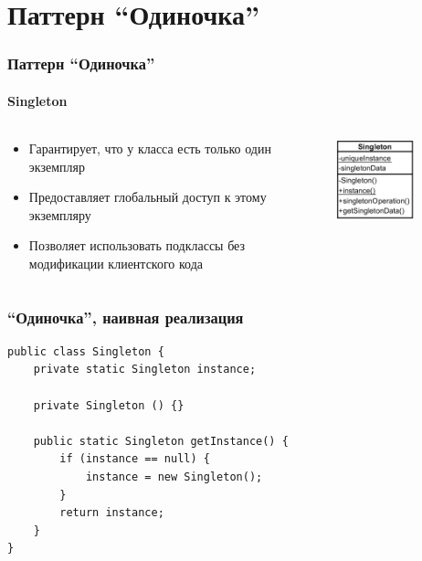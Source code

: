 \documentclass{../cscslides}
\begin{document}
    \section{Паттерн ``Одиночка''}

    \begin{frame}
        \frametitle{Паттерн ``Одиночка''}
        \framesubtitle{Singleton}
        \begin{columns}
            \begin{column}{0.6\textwidth}
                \begin{itemize}
                    \item Гарантирует, что у класса есть только один экземпляр
                    \item Предоставляет глобальный доступ к этому экземпляру
                    \item Позволяет использовать подклассы без модификации клиентского кода
                \end{itemize}
            \end{column}
            \begin{column}{0.4\textwidth}
                \begin{center}
                    \includegraphics[width=0.6\textwidth]{singleton.png}
                \end{center}
            \end{column}
        \end{columns}
    \end{frame}

    \begin{frame}[fragile]
        \frametitle{``Одиночка'', наивная реализация}
        \begin{verbatim}
public class Singleton {
    private static Singleton instance;

    private Singleton () {}

    public static Singleton getInstance() {
        if (instance == null) {
            instance = new Singleton();
        }
        return instance;
    }
}
        \end{verbatim}
    \end{frame}
\end{document}
